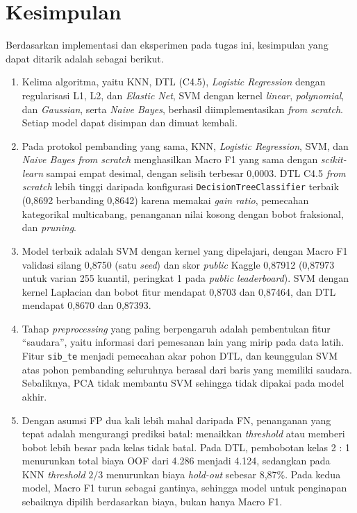 \section{Kesimpulan}
\label{sec:kesimpulan}

Berdasarkan implementasi dan eksperimen pada tugas ini, kesimpulan yang dapat ditarik adalah sebagai
berikut.

\begin{enumerate}
	\item Kelima algoritma, yaitu KNN, DTL (C4.5), \textit{Logistic Regression} dengan regularisasi L1,
	L2, dan \textit{Elastic Net}, SVM dengan kernel \textit{linear}, \textit{polynomial}, dan
	\textit{Gaussian}, serta \textit{Naive Bayes}, berhasil diimplementasikan \textit{from scratch}.
	Setiap model dapat disimpan dan dimuat kembali.
	\item Pada protokol pembanding yang sama, KNN, \textit{Logistic Regression}, SVM, dan \textit{Naive
	Bayes} \textit{from scratch} menghasilkan Macro F1 yang sama dengan \textit{scikit-learn} sampai
	empat desimal, dengan selisih terbesar 0,0003. DTL C4.5 \textit{from scratch} lebih tinggi daripada
	konfigurasi \texttt{DecisionTreeClassifier} terbaik (0,8692 berbanding 0,8642) karena memakai
	\textit{gain ratio}, pemecahan kategorikal multicabang, penanganan nilai kosong dengan bobot
	fraksional, dan \textit{pruning}.
	\item Model terbaik adalah SVM dengan kernel yang dipelajari, dengan Macro F1 validasi silang 0,8750 (satu
	\textit{seed}) dan skor \textit{public} Kaggle 0,87912 (0,87973 untuk varian 255 kuantil, peringkat 1 pada \textit{public leaderboard}). SVM dengan kernel Laplacian dan bobot fitur mendapat
	0,8703 dan 0,87464, dan DTL mendapat 0,8670 dan 0,87393.
	\item Tahap \textit{preprocessing} yang paling berpengaruh adalah pembentukan fitur ``saudara'', yaitu
	informasi dari pemesanan lain yang mirip pada data latih. Fitur \texttt{sib\_te} menjadi pemecahan
	akar pohon DTL, dan keunggulan SVM atas pohon pembanding seluruhnya berasal dari baris yang memiliki
	saudara. Sebaliknya, PCA tidak membantu SVM sehingga tidak dipakai pada model akhir.
	\item Dengan asumsi FP dua kali lebih mahal daripada FN, penanganan yang tepat adalah mengurangi
	prediksi batal: menaikkan \textit{threshold} atau memberi bobot lebih besar pada kelas tidak batal.
	Pada DTL, pembobotan kelas 2 : 1 menurunkan total biaya OOF dari 4.286 menjadi 4.124, sedangkan
	pada KNN \textit{threshold} $2/3$ menurunkan biaya \textit{hold-out} sebesar 8,87\%. Pada kedua
	model, Macro F1 turun sebagai gantinya, sehingga model untuk penginapan sebaiknya dipilih berdasarkan
	biaya, bukan hanya Macro F1.
\end{enumerate}

